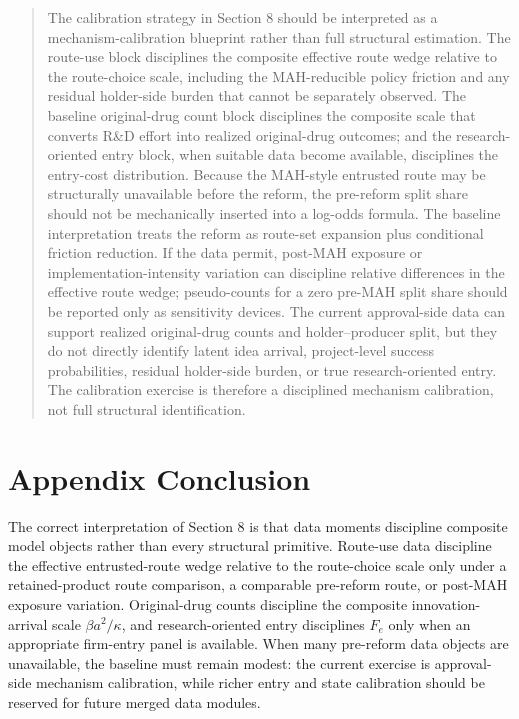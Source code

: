 \documentclass[12pt]{article}
\newcommand{\1}{\mathbf{1}}
\begin{document}
\begin{quote}
The calibration strategy in Section 8 should be interpreted as a mechanism-calibration blueprint rather than full structural estimation. The route-use block disciplines the composite effective route wedge relative to the route-choice scale, including the MAH-reducible policy friction and any residual holder-side burden that cannot be separately observed. The baseline original-drug count block disciplines the composite scale that converts R\&D effort into realized original-drug outcomes; and the research-oriented entry block, when suitable data become available, disciplines the entry-cost distribution. Because the MAH-style entrusted route may be structurally unavailable before the reform, the pre-reform split share should not be mechanically inserted into a log-odds formula. The baseline interpretation treats the reform as route-set expansion plus conditional friction reduction. If the data permit, post-MAH exposure or implementation-intensity variation can discipline relative differences in the effective route wedge; pseudo-counts for a zero pre-MAH split share should be reported only as sensitivity devices. The current approval-side data can support realized original-drug counts and holder--producer split, but they do not directly identify latent idea arrival, project-level success probabilities, residual holder-side burden, or true research-oriented entry. The calibration exercise is therefore a disciplined mechanism calibration, not full structural identification.
\end{quote}

\section{Appendix Conclusion}

The correct interpretation of Section 8 is that data moments discipline composite model objects rather than every structural primitive. Route-use data discipline the effective entrusted-route wedge relative to the route-choice scale only under a retained-product route comparison, a comparable pre-reform route, or post-MAH exposure variation. Original-drug counts discipline the composite innovation-arrival scale $\beta a^2/\kappa$, and research-oriented entry disciplines $F_e$ only when an appropriate firm-entry panel is available. When many pre-reform data objects are unavailable, the baseline must remain modest: the current exercise is approval-side mechanism calibration, while richer entry and state calibration should be reserved for future merged data modules.
\end{document}
